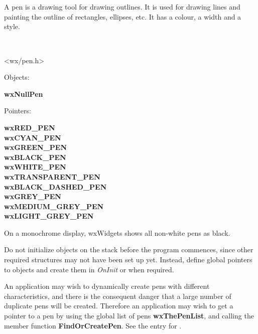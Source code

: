 
\section{}\label{wxpen}

A pen is a drawing tool for drawing outlines. It is used for drawing
lines and painting the outline of rectangles, ellipses, etc. It has a
colour, a width and a style.


\\


<wx/pen.h>


Objects:

{\bf wxNullPen}

Pointers:

{\bf wxRED\_PEN\\
wxCYAN\_PEN\\
wxGREEN\_PEN\\
wxBLACK\_PEN\\
wxWHITE\_PEN\\
wxTRANSPARENT\_PEN\\
wxBLACK\_DASHED\_PEN\\
wxGREY\_PEN\\
wxMEDIUM\_GREY\_PEN\\
wxLIGHT\_GREY\_PEN}


On a monochrome display, wxWidgets shows all non-white pens as black.

Do not initialize objects on the stack before the program commences,
since other required structures may not have been set up yet. Instead,
define global pointers to objects and create them in {\it OnInit} or
when required.

An application may wish to dynamically create pens with different
characteristics, and there is the consequent danger that a large number
of duplicate pens will be created. Therefore an application may wish to
get a pointer to a pen by using the global list of pens {\bf
wxThePenList}, and calling the member function {\bf FindOrCreatePen}.
See the entry for .

